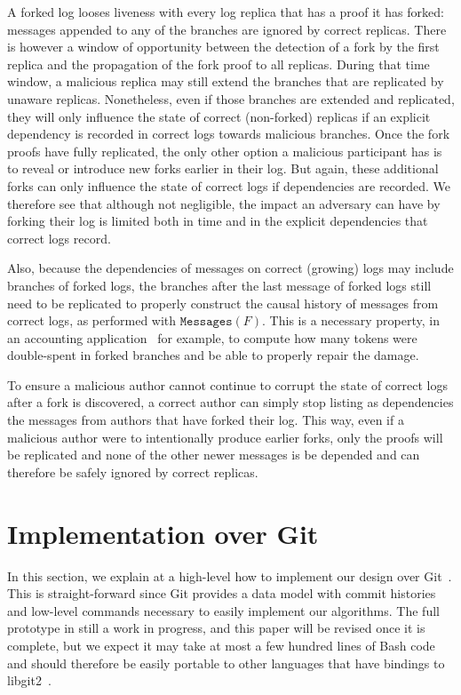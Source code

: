 \documentclass[9pt, oneside]{article}   	%
\begin{document}
A forked log looses liveness with every log replica that has a proof it has forked: messages appended to any of the branches are ignored by correct replicas. There is however a window of opportunity between the detection of a fork by the first replica and the propagation of the fork proof to all replicas. During that time window, a malicious replica may still extend the branches that are replicated by unaware replicas. Nonetheless, even if those branches are extended and replicated, they will only influence the state of correct (non-forked) replicas if an explicit dependency is recorded in correct logs towards malicious branches. Once the fork proofs have fully replicated, the only other option a malicious participant has is to reveal or introduce new forks earlier in their log. But again, these additional forks can only influence the state of correct logs if dependencies are recorded. We therefore see that although not negligible, the impact an adversary can have by forking their log is limited both in time and in the explicit dependencies that correct logs record.

Also, because the dependencies of messages on correct (growing) logs may include branches of forked logs, the branches after the last message of forked logs still need to be replicated to properly construct the causal history of messages from correct logs, as performed with $\texttt{Messages}(F)$. This is a necessary property, in an accounting application~\cite{lavoie2023gocledger} for example, to compute how many tokens were double-spent in forked branches and be able to properly repair the damage.

To ensure a malicious author cannot continue to corrupt the state of correct logs after a fork is discovered, a correct author can simply stop listing as dependencies the messages from authors that have forked their log. This way, even if a malicious author were to intentionally produce earlier forks, only the proofs will be replicated and none of the other newer messages is be depended and can therefore be safely ignored by correct replicas.

\newpage
\section{Implementation over Git}
\label{sec:git-implementation}

In this section, we explain at a high-level how to implement our design over Git~\cite{git}. This is straight-forward since Git provides a data model with commit histories and low-level commands necessary to easily implement our algorithms. The full prototype in still a work in progress, and this paper will be revised once it is complete, but we expect it may take at most a few hundred lines of Bash code and should therefore be easily portable to other languages that have bindings to libgit2~\cite{libgit2}.
\end{document}
